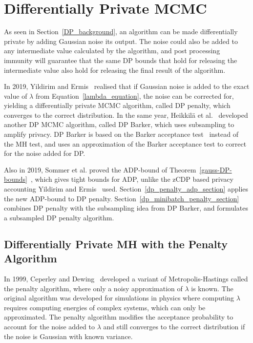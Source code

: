 \documentclass[english,twoside,openright]{HYgraduMLDS}
\begin{document}
\chapter{Differentially Private MCMC}\label{dp_mcmc_chapter}

As seen in Section~\ref{DP_background}, an algorithm can be made differentially 
private by adding Gaussian noise its output. The noise could also be added
to any intermediate value calculated by the algorithm, and post processing immunity 
will guarantee that the same DP bounds that hold for releasing the intermediate 
value also hold for releasing the final result of the algorithm.

In 2019, Yildirim and Ermis~\cite{YildirimE19} realised that if Gaussian noise
is added to the exact value of \(\lambda\) from Equation~\ref{lambda_equation},
the noise can be corrected for,
yielding a differentially private MCMC algorithm, called DP penalty,
which converges to 
the correct distribution. In the same year, Heikkilä et al.~\cite{HeikkilaJDH19}
developed another DP MCMC algorithm, called DP Barker, which uses subsampling 
to amplify privacy. DP Barker is based on the Barker acceptance
test~\cite{Barker65} instead of the MH test, and uses an approximation
of the Barker acceptance test to correct for the noise added for DP.

Also in 2019, Sommer et al. proved the ADP-bound of
Theorem~\ref{gauss-DP-bounds}~\cite{Sommer2019}, which gives tight bounds for
ADP, unlike the zCDP based privacy accounting Yildirim and
Ermis~\cite{YildirimE19} used. Section~\ref{dp_penalty_adp_section} applies
the new ADP-bound to DP penalty.
Section~\ref{dp_minibatch_penalty_section} combines DP penalty with the
subsampling idea from DP Barker, and formulates a subsampled DP penalty
algorithm.

\section{Differentially Private MH with the Penalty Algorithm}\label{dp_penalty_section}

In 1999, Ceperley and Dewing~\cite{CeD99} developed a variant of 
Metropolis-Hastings called the penalty 
algorithm, where only a noisy approximation of \(\lambda\) is known. The
original algorithm was
developed for simulations in physics where computing \(\lambda\)
requires computing energies of complex systems, which can only be approximated.
The penalty algorithm modifies the acceptance probability to account for the 
noise added to \(\lambda\) and still converges to the correct distribution if 
the noise is Gaussian with known variance.
\end{document}
